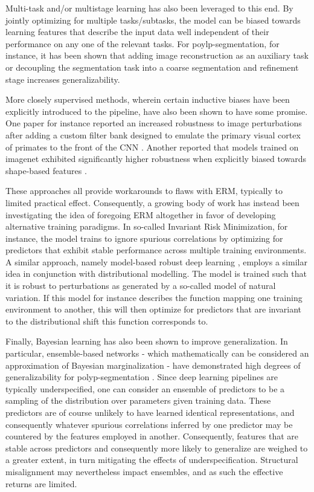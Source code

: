 Multi-task and/or multistage learning has also been leveraged to this end. By jointly optimizing for multiple tasks/subtasks, the model can be biased towards learning features that describe the input data well independent of their performance on any one of the relevant tasks. For poylp-segmentation, for instance, it has been shown that adding image reconstruction as an auxiliary task \cite{ddanet} or decoupling the segmentation task into a coarse segmentation and refinement stage \cite{doubleencdec} increases generalizability. 

More closely supervised methods, wherein certain inductive biases have been explicitly introduced to the pipeline, have also been shown to have some promise. One paper for instance reported an increased robustness to image perturbations after adding a custom filter bank designed to emulate the primary visual cortex of primates to the front of the CNN \cite{visual_cortex}. Another reported that models trained on imagenet exhibited significantly higher robustness when explicitly biased towards shape-based features \cite{texturebias}. 

	
These approaches all provide workarounds to flaws with ERM, typically to limited practical effect. Consequently, a growing body of work has instead been investigating the idea of foregoing ERM altogether in favor of developing alternative training paradigms. In so-called Invariant Risk Minimization\cite{IRM}, for instance, the model trains to ignore spurious correlations by optimizing for predictors that exhibit stable performance across multiple training environments. A similar approach, namely model-based robust deep learning \cite{modelbased}, employs a similar idea in conjunction with distributional modelling. The model is trained such that it is robust to perturbations as generated by a so-called model of natural variation. If this model for instance describes the function mapping one training environment to another, this will then optimize for predictors that are invariant to the distributional shift this function corresponds to. 

Finally, Bayesian learning has also been shown to improve generalization. In particular, ensemble-based networks - which mathematically can be considered an approximation of Bayesian marginalization \cite{bayesian_case,bayesian_generalization} - have demonstrated high degrees of generalizability for polyp-segmentation \cite{divergentnets,endoensemble}. Since deep learning pipelines are typically underspecified, one can consider an ensemble of predictors to be a sampling of the distribution over parameters given training data. These predictors are of course unlikely to have learned identical representations, and consequently whatever spurious correlations inferred by one predictor may be countered by the features employed in another. Consequently, features that are stable across predictors and consequently more likely to generalize are weighed to a greater extent, in turn mitigating the effects of underspecification. Structural misalignment may nevertheless impact ensembles, and as such the effective returns are limited. 

